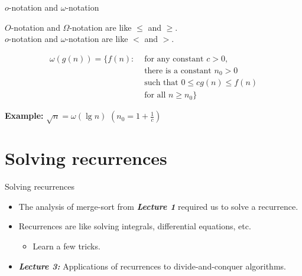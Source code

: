 \documentclass{beamer}
\begin{document}
\begin{frame}{$o$-notation and $\omega$-notation}
    \begin{block}{}
        $O$-notation and $\Omega$-notation are like $\leq$ and $\geq$.\\
        $o$-notation and $\omega$-notation are like $<$ and $>$.
    \end{block}
    \begin{tcolorbox}
        \begin{align*}
            \omega(g(n)) = \{ f(n):  & \text{ for any constant } c > 0, \\
                                                   & \text{ there is a constant } n_0 > 0 \\
                                                   & \text{ such that } 0 \leq cg(n) \leq f(n) \\
                                                   & \text{ for all } n \geq n_0\}
        \end{align*}
    \end{tcolorbox}
    \begin{exampleblock}{\textbf{Example:}}
        \vspace{2mm}
        $ \sqrt{n} = \omega(\lg n) $ \hspace{5mm} $(n_0 = 1 + \frac{1}{c})$
    \end{exampleblock}
\end{frame}

\section{Solving recurrences}

\begin{frame}{Solving recurrences}
    \begin{itemize}
        \item The analysis of merge-sort from \textbf{\textit{Lecture 1}} required us to solve a recurrence.
        \item Recurrences are like solving integrals, differential equations, etc.
        \begin{itemize}
            \item Learn a few tricks.
        \end{itemize}
        \item \textbf{\textit{Lecture 3:}} Applications of recurrences to divide-and-conquer algorithms.
    \end{itemize}
\end{frame}
\end{document}
